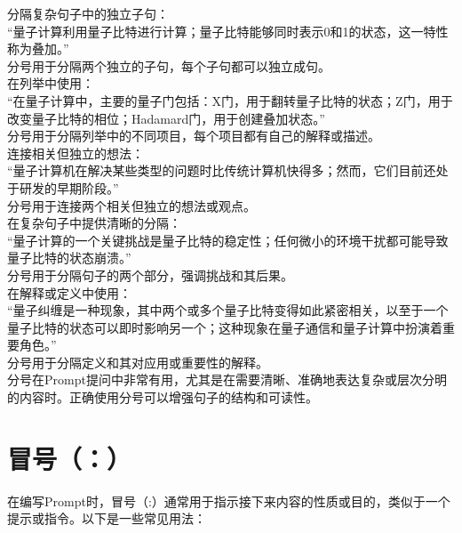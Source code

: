 \documentclass[12pt]{book}
\begin{document}
分隔复杂句子中的独立子句：\\
“量子计算利用量子比特进行计算；量子比特能够同时表示0和1的状态，这一特性称为叠加。”\\
分号用于分隔两个独立的子句，每个子句都可以独立成句。\\
在列举中使用：\\
“在量子计算中，主要的量子门包括：X门，用于翻转量子比特的状态；Z门，用于改变量子比特的相位；Hadamard门，用于创建叠加状态。”\\
分号用于分隔列举中的不同项目，每个项目都有自己的解释或描述。\\
连接相关但独立的想法：\\
“量子计算机在解决某些类型的问题时比传统计算机快得多；然而，它们目前还处于研发的早期阶段。”\\
分号用于连接两个相关但独立的想法或观点。\\
在复杂句子中提供清晰的分隔：\\
“量子计算的一个关键挑战是量子比特的稳定性；任何微小的环境干扰都可能导致量子比特的状态崩溃。”\\
分号用于分隔句子的两个部分，强调挑战和其后果。\\
在解释或定义中使用：\\
“量子纠缠是一种现象，其中两个或多个量子比特变得如此紧密相关，以至于一个量子比特的状态可以即时影响另一个；这种现象在量子通信和量子计算中扮演着重要角色。”\\
分号用于分隔定义和其对应用或重要性的解释。\\
分号在Prompt提问中非常有用，尤其是在需要清晰、准确地表达复杂或层次分明的内容时。正确使用分号可以增强句子的结构和可读性。\\

\section{冒号（：）}
在编写Prompt时，冒号（:）通常用于指示接下来内容的性质或目的，类似于一个提示或指令。以下是一些常见用法：\\
\end{document}

